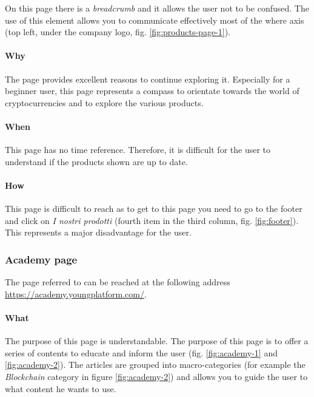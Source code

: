On this page there is a \textit{breadcrumb} and it allows the user not to 
be confused. The use of this element allows you to communicate effectively 
most of the where axis (top left, under the company logo, fig. 
\ref{fig:products-page-1}).

\paragraph{Why}

The page provides excellent reasons to continue exploring it. Especially 
for a beginner user, this page represents a compass to orientate towards 
the world of cryptocurrencies and to explore the various products.

\paragraph{When}

This page has no time reference. Therefore, it is difficult for the user 
to understand if the products shown are up to date.

\paragraph{How}

This page is difficult to reach as to get to this page you need to go to 
the footer and click on \textit{I nostri prodotti} (fourth item in the 
third column, fig. \ref{fig:footer}). This represents a major disadvantage 
for the user.

\subsubsection{Academy page}

The page referred to can be reached at the following address 
\href{https://academy.youngplatform.com/}{https://academy.youngplatform.com/}.

\paragraph{What}

The purpose of this page is understandable. The purpose of this page is to 
offer a series of contents to educate and inform the user 
(fig. \ref{fig:academy-1} and \ref{fig:academy-2}). The articles are 
grouped into macro-categories (for example the \textit{Blockchain} category 
in figure \ref{fig:academy-2}) and allows you to guide the user to what 
content he wants to use. 

